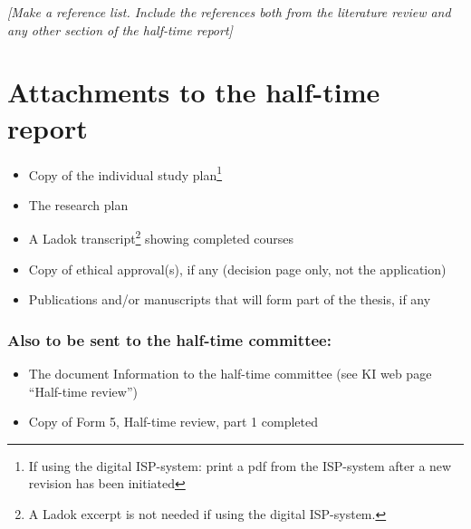 \documentclass{kihalftimedefaultfonts}
\begin{document}
\newpage
{}
{ \small \textit{[Make a reference list. Include the references both from the literature review and any other section of the half-time report]}}
\printbibliography

\newpage
\section*{Attachments to the half-time report}
\begin{itemize}
    \item Copy of the individual study plan\footnote{If using the digital ISP-system: print a pdf from the ISP-system after a new revision has been initiated}
    \item The research plan  
    \item A Ladok transcript\footnote{A Ladok excerpt is not needed if using the digital ISP-system.} showing completed courses
    \item Copy of ethical approval(s), if any (decision page only, not the application)
    \item Publications and/or manuscripts that will form part of the thesis, if any
\end{itemize}

\subsubsection*{Also to be sent to the half-time committee:}
\begin{itemize}
    \item The document Information to the half-time committee (see KI web page “Half-time review”)
    \item Copy of Form 5, Half-time review, part 1 completed 
\end{itemize}

\end{document}
